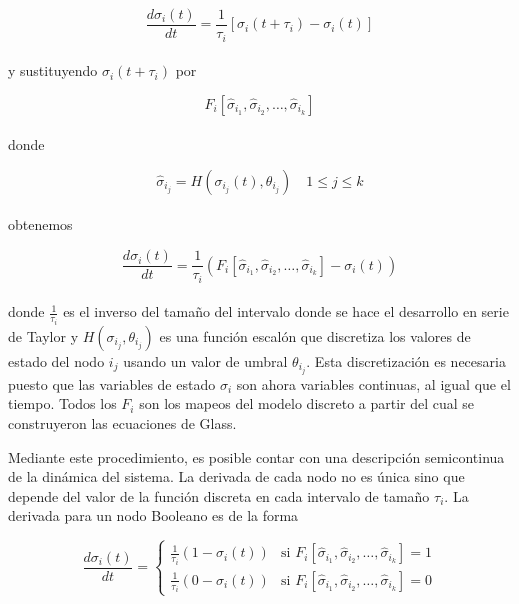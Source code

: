 \begin{equation}
\frac{d\sigma_i(t)}{dt} = \frac{1}{\tau_i} [\sigma_i(t+\tau_i) - \sigma_i(t)]
\end{equation}
\\
y sustituyendo $\sigma_i(t+\tau_i)$ por 

\begin{equation}
F_i[\hat{\sigma}_{i_1}, \hat{\sigma}_{i_2}, \ldots, \hat{\sigma}_{i_k}]
\end{equation}
\\
donde

\begin{equation}
\hat{\sigma}_{i_j} = H(\sigma_{i_j}(t), \theta_{i_j})\quad 1\le j \le k
\end{equation}
\\

obtenemos 

\begin{equation}
\frac{d\sigma_i(t)}{dt} = \frac{1}{\tau_i} (F_i[\hat{\sigma}_{i_1}, \hat{\sigma}_{i_2}, \ldots, \hat{\sigma}_{i_k}]
 - \sigma_i(t))
\end{equation} 
\\
donde $\frac{1}{\tau_i}$ es el inverso del tamaño del intervalo donde se hace el desarrollo en serie de Taylor y $H(\sigma_{i_j}, \theta_{i_j})$ es una función escalón que discretiza los valores de estado del nodo $i_j$ usando un valor de umbral $\theta_{i_j}$. Esta discretización es necesaria puesto que las variables de estado $\sigma_i$ son ahora variables continuas, al igual que el tiempo. Todos los $F_i$ son los mapeos del modelo discreto a partir del cual se construyeron las ecuaciones de Glass.

Mediante este procedimiento, es posible contar con una descripción semicontinua de la dinámica del sistema. La derivada de cada nodo no es única sino que depende del valor de la función discreta en cada intervalo de tamaño $\tau_i$. La derivada para un nodo Booleano es de la forma

\begin{equation}
\frac{d\sigma_i(t)}{dt} = \left\{
    \begin{array}{rr}
      \frac{1}{\tau_i} (1 - \sigma_i(t)) & \text{si } F_i[\hat{\sigma}_{i_1}, \hat{\sigma}_{i_2}, \ldots, \hat{\sigma}_{i_k}] = 1\\
      \frac{1}{\tau_i} (0 - \sigma_i(t)) & \text{si } F_i[\hat{\sigma}_{i_1}, \hat{\sigma}_{i_2}, \ldots, \hat{\sigma}_{i_k}] = 0
    \end{array} \right.
\end{equation} 
\\

